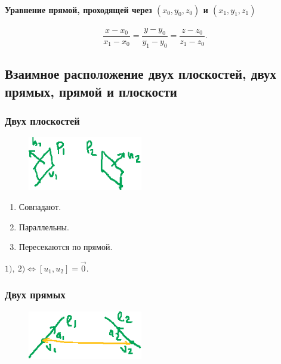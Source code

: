 \paragraph{Уравнение прямой, проходящей через $(x_0, y_0, z_0)$ и $(x_1, y_1, z_1)$}

\begin{equation*}
    \frac{x - x_0}{x_1 - x_0} = \frac{y - y_0}{y_1 - y_0} = \frac{z - z_0}{z_1 - z_0}
.\end{equation*}


\subsection{Взаимное расположение двух плоскостей, двух прямых, прямой и плоскости}

\subsubsection{Двух плоскостей}

\begin{figure}
    \vspace{-70pt}
    \includegraphics[width=5cm]{lecture26_drawing_4}
\end{figure}

\begin{enumerate}[nosep]
    \item \label{lec26:l1} Совпадают.
    \item \label{lec26:l2} Параллельны.
    \item Пересекаются по прямой.
\end{enumerate}

\medskip
$\hyperref[lec26:l1]{1)}, \ \hyperref[lec26:l2]{2)} \iff [u_1, u_2] = \overrightarrow{0}$.


\subsubsection{Двух прямых}

\begin{figure}
    \vspace{-70pt}
    \includegraphics[width=5cm]{lecture26_drawing_5}
\end{figure}

